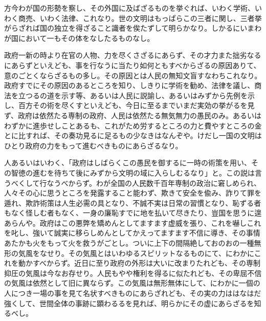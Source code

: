 \documentclass[a4paper, platex, dvipdfmx]{jsarticle}
\begin{document}
方今わが国の形勢を察し、その外国に及ばざるものを挙ぐれば、いわく学術、いわく商売、いわく法律、これなり。世の文明はもっぱらこの三者に関し、三者挙がらざれば国の独立を得ざること識者を俟たずして明らかなり。しかるにいまわが国において一もその体をなしたるものなし。

政府一新の時より在官の人物、力を尽くさざるにあらず、その才力また拙劣なるにあらずといえども、事を行なうに当たり如何ともすべからざるの原因ありて、意のごとくならざるもの多し。その原因とは人民の無知文盲すなわちこれなり。政府すでにその原因のあるところを知り、しきりに学術を勧め、法律を議し、商法を立つるの道を示す等、あるいは人民に説諭し、あるいはみずから先例を示し、百方その術を尽くすといえども、今日に至るまでいまだ実効の挙がるを見ず、政府は依然たる専制の政府、人民は依然たる無気無力の愚民のみ。あるいはわずかに進歩せしことあるも、これがため労するところの力と費やすところの金とに比すれば、その奏功見るに足るもの少なきはなんぞや。けだし一国の文明はひとり政府の力をもって進むべきものにあらざるなり。

人あるいはいわく、「政府はしばらくこの愚民を御するに一時の術策を用い、その智徳の進むを待ちて後にみずから文明の域に入らしむるなり」と。この説は言うべくして行なうべからず。わが全国の人民数千百年専制の政治に窘しめられ、人々その心に思うところを発露すること能わず、欺きて安全を偸み、詐りて罪を遁れ、欺詐術策は人生必需の具となり、不誠不実は日常の習慣となり、恥ずる者もなく怪しむ者もなく、一身の廉恥すでに地を払いて尽きたり、豈国を思うに遑あらんや。政府はこの悪弊を矯めんとしてますます虚威を張り、これを嚇しこれを叱し、強いて誠実に移らしめんとしてかえってますます不信に導き、その事情あたかも火をもって火を救うがごとし。ついに上下の間隔絶しておのおの一種無形の気風をなせり。その気風とはいわゆるスピリットなるものにて、にわかにこれを動かすべからず。近日に至り政府の外形は大いに改まりたれども、その専制抑圧の気風は今なお存せり。人民もやや権利を得るに似たれども、その卑屈不信の気風は依然として旧に異ならず。この気風は無形無体にして、にわかに一個の人につき一場の事を見て名状すべきものにあらざれども、その実の力ははなはだ強くして、世間全体の事跡に顕わるるを見れば、明らかにその虚にあらざるを知るべし。
\end{document}
